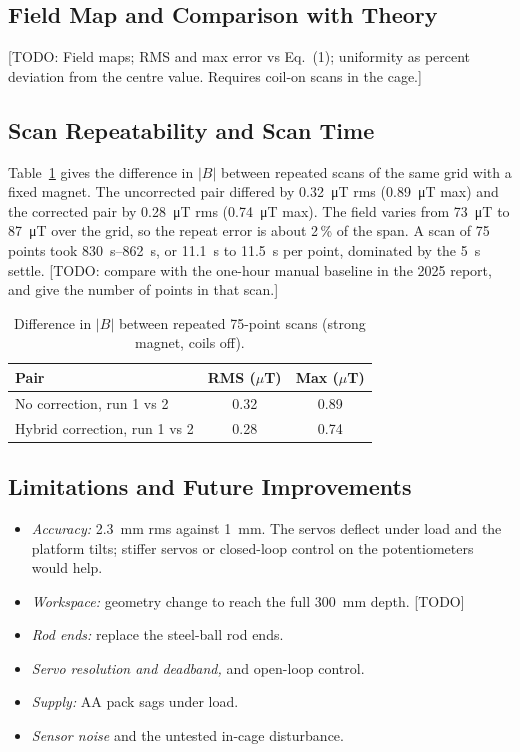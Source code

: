 \documentclass[conference]{IEEEtran}
\begin{document}
\subsection{Field Map and Comparison with Theory}
[TODO: Field maps; RMS and max error vs Eq.~(1); uniformity as percent deviation
from the centre value. Requires coil-on scans in the cage.]

\subsection{Scan Repeatability and Scan Time}
Table~\ref{tab:rep} gives the difference in $|B|$ between repeated scans of the same
grid with a fixed magnet. The uncorrected pair differed by \SI{0.32}{\micro T} rms
(\SI{0.89}{\micro T} max) and the corrected pair by \SI{0.28}{\micro T} rms
(\SI{0.74}{\micro T} max). The field varies from \SI{73}{\micro T} to
\SI{87}{\micro T} over the grid, so the repeat error is about 2\,\% of the span.
A scan of 75 points took \SIrange{830}{862}{s}, or \SI{11.1}{s} to \SI{11.5}{s} per
point, dominated by the \SI{5}{s} settle. [TODO: compare with the one-hour manual
baseline in the 2025 report, and give the number of points in that scan.]
\begin{table}[t]
\caption{Difference in $|B|$ between repeated 75-point scans (strong magnet, coils off).}
\label{tab:rep}
\centering\small
\begin{tabular}{lcc}
\toprule
Pair & RMS ($\mu$T) & Max ($\mu$T) \\
\midrule
No correction, run 1 vs 2 & 0.32 & 0.89 \\
Hybrid correction, run 1 vs 2 & 0.28 & 0.74 \\
\bottomrule
\end{tabular}
\end{table}

\subsection{Limitations and Future Improvements}
\begin{itemize}
\item \emph{Accuracy:} \SI{2.3}{mm} rms against \SI{1}{mm}. The servos deflect under
load and the platform tilts; stiffer servos or closed-loop control on the
potentiometers would help.
\item \emph{Workspace:} geometry change to reach the full \SI{300}{mm} depth. [TODO]
\item \emph{Rod ends:} replace the steel-ball rod ends.
\item \emph{Servo resolution and deadband,} and open-loop control.
\item \emph{Supply:} AA pack sags under load.
\item \emph{Sensor noise} and the untested in-cage disturbance.
\end{itemize}
\end{document}
